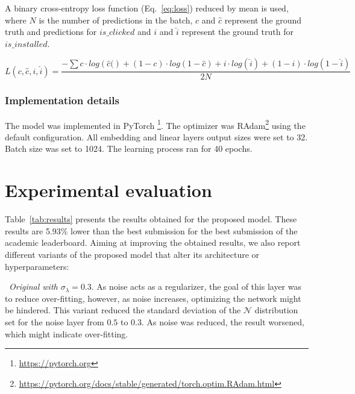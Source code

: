 \documentclass[manuscript,nonacm]{acmart}
\begin{document}
A binary cross-entropy loss function (Eq.~\ref{eq:loss}) reduced by mean is used, where $N$ is the number of predictions in the batch, $c$ and $\hat{c}$ represent the ground truth and predictions for $is\_clicked$ and $i$ and $\hat{i}$ represent the ground truth for $is\_installed$.\vspace{-0.3cm}

\begin{equation}\label{eq:loss}
    L\left(c,\hat{c},i,\hat{i}\right) = \frac{
                -\sum c \cdot log\left( \hat{c} (\right)
                + \left(1-c\right) \cdot log\left(1-\hat{c}\right)
                + i \cdot log\left( \hat{i} \right)
                +\left(1-i\right) \cdot log\left(1-\hat{i}\right)
                }{2N} 
\end{equation}



\subsubsection*{\textbf{Implementation details}}\hfill 

The model was implemented in PyTorch \footnote{\url{https://pytorch.org}}. The optimizer was RAdam\footnote{\url{https://pytorch.org/docs/stable/generated/torch.optim.RAdam.html}} using the default configuration. All embedding and linear layers output sizes were set to 32. Batch size was set to 1024. The learning process ran for 40 epochs.

\section{Experimental evaluation}\label{sec:evaluation}

Table~\ref{tab:results} presents the results obtained for the proposed model. These results are 5.93\% lower than the best submission for the best submission of the academic leaderboard. Aiming at improving the obtained results, we also report different variants of the proposed model that alter its architecture or hyperparameters: 

\noindent\textbullet~\textit{Original with $\sigma_\lambda = 0.3$}. As noise acts as a regularizer, the goal of this layer was to reduce over-fitting, however, as noise increases, optimizing the network might be hindered. This variant reduced the standard deviation of the $\mathcal{N}$ distribution set for the noise layer from $0.5$ to $0.3$. As noise was reduced, the result worsened, which might indicate over-fitting.
\end{document}
